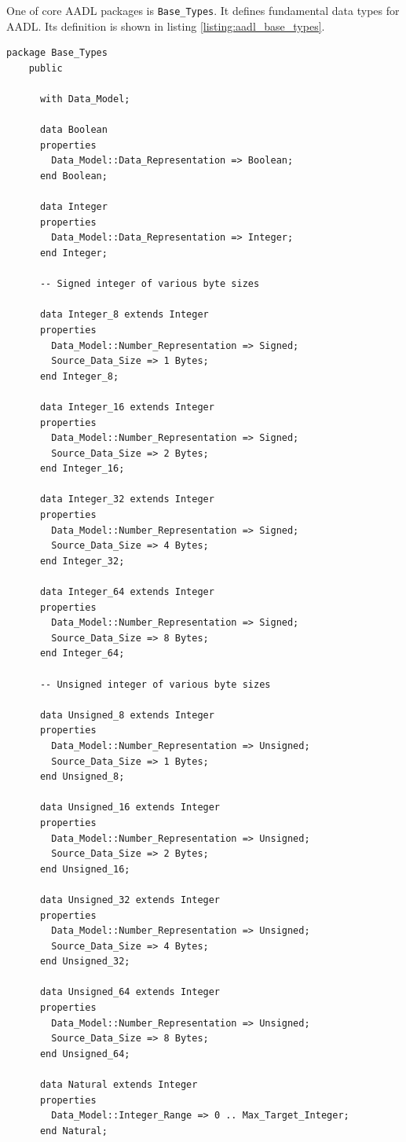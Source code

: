 One of core AADL packages is \lstinline{Base_Types}. It defines fundamental data types for AADL. Its definition is shown in listing \ref{listing:aadl_base_types}.

\singlespacing
\begin{lstlisting}[language=aadl, frame=single, gobble=0, caption={AADL Base\_Types package}]
	package Base_Types
	public

	  with Data_Model;

	  data Boolean
	  properties 
	    Data_Model::Data_Representation => Boolean;
	  end Boolean;

	  data Integer
	  properties
	    Data_Model::Data_Representation => Integer;
	  end Integer;

	  -- Signed integer of various byte sizes

	  data Integer_8 extends Integer
	  properties
	    Data_Model::Number_Representation => Signed;
	    Source_Data_Size => 1 Bytes;
	  end Integer_8;

	  data Integer_16 extends Integer
	  properties
	    Data_Model::Number_Representation => Signed;
	    Source_Data_Size => 2 Bytes;
	  end Integer_16;

	  data Integer_32 extends Integer
	  properties
	    Data_Model::Number_Representation => Signed;
	    Source_Data_Size => 4 Bytes;
	  end Integer_32;

	  data Integer_64 extends Integer
	  properties
	    Data_Model::Number_Representation => Signed;
	    Source_Data_Size => 8 Bytes;
	  end Integer_64;

	  -- Unsigned integer of various byte sizes

	  data Unsigned_8 extends Integer
	  properties
	    Data_Model::Number_Representation => Unsigned;
	    Source_Data_Size => 1 Bytes;
	  end Unsigned_8;

	  data Unsigned_16 extends Integer
	  properties
	    Data_Model::Number_Representation => Unsigned;
	    Source_Data_Size => 2 Bytes;
	  end Unsigned_16;

	  data Unsigned_32 extends Integer
	  properties
	    Data_Model::Number_Representation => Unsigned;
	    Source_Data_Size => 4 Bytes;
	  end Unsigned_32;

	  data Unsigned_64 extends Integer
	  properties
	    Data_Model::Number_Representation => Unsigned;
	    Source_Data_Size => 8 Bytes;
	  end Unsigned_64;

	  data Natural extends Integer
	  properties 
	    Data_Model::Integer_Range => 0 .. Max_Target_Integer;
	  end Natural;


\end{lstlisting}
